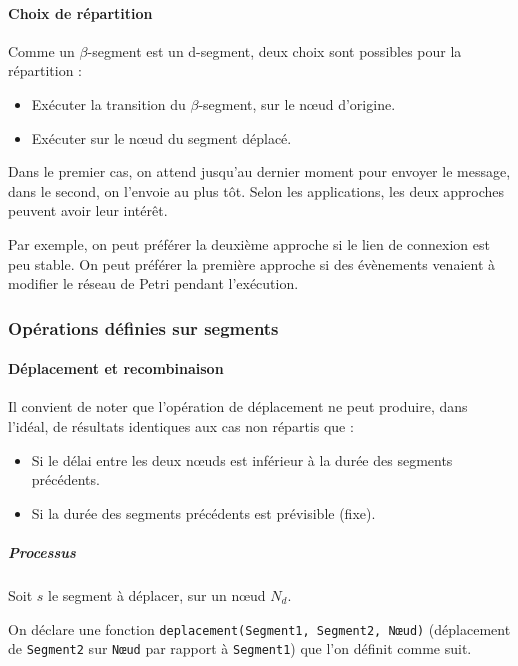 \paragraph{Choix de répartition}
Comme un $\beta$-segment est un d-segment, deux choix sont possibles pour la répartition : 

\begin{itemize}
	\item Exécuter la transition du $\beta$-segment, sur le nœud d'origine.
	\item Exécuter sur le nœud du segment déplacé.
\end{itemize}

Dans le premier cas, on attend jusqu'au dernier moment pour envoyer le message, dans le second, on l'envoie au plus tôt. Selon les applications, les deux approches peuvent avoir leur intérêt.

Par exemple, on peut préférer la deuxième approche si le lien de connexion est peu stable. On peut préférer la première approche si des évènements venaient à modifier le réseau de Petri pendant l'exécution.

\subsubsection{Opérations définies sur segments}
\paragraph{Déplacement et recombinaison}

Il convient de noter que l'opération de déplacement ne peut produire, dans l'idéal, de résultats identiques aux cas non répartis que : 
\begin{itemize}
\item Si le délai entre les deux nœuds est inférieur à la durée des segments précédents.
\item Si la durée des segments précédents est prévisible (fixe).
\end{itemize} 

\subparagraph{Processus}
Soit $s$ le segment à déplacer, sur un nœud $N_d$.

On déclare une fonction \texttt{deplacement(Segment1, Segment2, Nœud)} (déplacement de \texttt{Segment2} sur \texttt{Nœud} par rapport à \texttt{Segment1}) que l'on définit comme suit.

